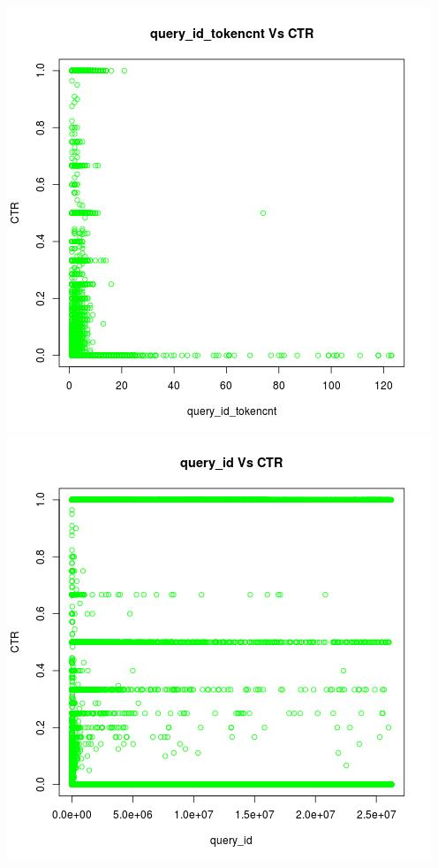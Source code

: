 \documentclass[10pt]{article}
\begin{document}
\includegraphics[scale=0.5]{query_id_tokencnt_Vs_CTR}
\includegraphics[scale=0.5]{query_id_Vs_CTR}\\\\
\end{document}
